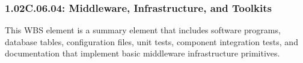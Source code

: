 \subsubsection{1.02C.06.04: Middleware, Infrastructure, and Toolkits}

This WBS element is a summary element that includes software programs, database tables, configuration files, unit tests, component integration tests, and documentation that implement basic middleware infrastructure primitives.
